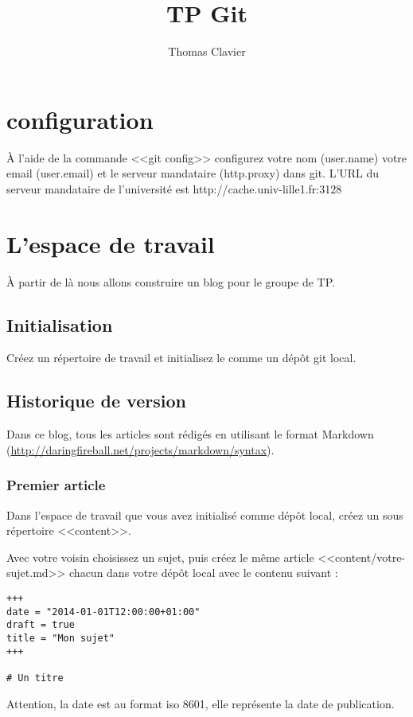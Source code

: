 \documentclass[a4paper]{article}
\title{TP Git}
\author{Thomas Clavier}
\date{}
\begin{document}
\maketitle

\section{configuration}

À l'aide de la commande <<git config>> configurez votre nom (user.name) votre email (user.email) et le serveur mandataire (http.proxy) dans git. L'URL du serveur mandataire de l'université est http://cache.univ-lille1.fr:3128

\section{L'espace de travail}

À partir de là nous allons construire un blog pour le groupe de TP.

\subsection{Initialisation}
Créez un répertoire de travail et initialisez le comme un dépôt git local.

\subsection{Historique de version}
Dans ce blog, tous les articles sont rédigés en utilisant le format Markdown (\url{http://daringfireball.net/projects/markdown/syntax}).

\subsubsection{Premier article}
Dans l'espace de travail que vous avez initialisé comme dépôt local, créez un sous répertoire <<content>>.

Avec votre voisin choisissez un sujet, puis créez le même article <<content/votre-sujet.md>> chacun dans votre dépôt local avec le contenu suivant : 

\begin{verbatim}
+++
date = "2014-01-01T12:00:00+01:00"
draft = true
title = "Mon sujet"
+++

# Un titre
\end{verbatim}

Attention, la date est au format iso 8601, elle représente la date de publication.
\end{document}
